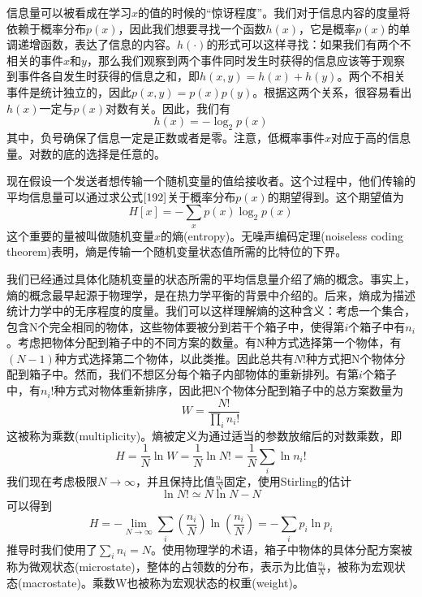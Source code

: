 信息量可以被看成在学习$x$的值的时候的“惊讶程度”。我们对于信息内容的度量将依赖于概率分布$p(x)$，因此我们想要寻找一个函数$h(x)$，它是概率$p(x)$的单调递增函数，表达了信息的内容。$h(\cdot)$的形式可以这样寻找：如果我们有两个不相关的事件$x$和$y$，那么我们观察到两个事件同时发生时获得的信息应该等于观察到事件各自发生时获得的信息之和，即$h(x,y)=h(x)+h(y)$。两个不相关事件是统计独立的，因此$p(x,y)=p(x)p(y)$。根据这两个关系，很容易看出$h(x)$一定与$p(x)$对数有关。因此，我们有
\begin{equation}
\label{192}
	h(x)=-\log_2p(x)
\end{equation}
其中，负号确保了信息一定是正数或者是零。注意，低概率事件$x$对应于高的信息量。对数的底的选择是任意的。

现在假设一个发送者想传输一个随机变量的值给接收者。这个过程中，他们传输的平均信息量可以通过求公式$\ref{192}$关于概率分布$p(x)$的期望得到。这个期望值为
\begin{equation}
	H[x]=-\sum_xp(x)\log_2p(x)
\end{equation}
这个重要的量被叫做随机变量$x$的熵(entropy)。无噪声编码定理(noiseless coding theorem)表明，熵是传输一个随机变量状态值所需的比特位的下界。

我们已经通过具体化随机变量的状态所需的平均信息量介绍了熵的概念。事实上，熵的概念最早起源于物理学，是在热力学平衡的背景中介绍的。后来，熵成为描述统计力学中的无序程度的度量。我们可以这样理解熵的这种含义：考虑一个集合，包含N个完全相同的物体，这些物体要被分到若干个箱子中，使得第$i$个箱子中有$n_i$。考虑把物体分配到箱子中的不同方案的数量。有N种方式选择第一个物体，有$(N-1)$种方式选择第二个物体，以此类推。因此总共有$N!$种方式把N个物体分配到箱子中。然而，我们不想区分每个箱子内部物体的重新排列。有第$i$个箱子中，有$n_i!$种方式对物体重新排序，因此把N个物体分配到箱子中的总方案数量为
\begin{equation}
	W=\frac{N!}{\prod_{i}n_i!}
\end{equation}
这被称为乘数(multiplicity)。熵被定义为通过适当的参数放缩后的对数乘数，即
\begin{equation}
	H=\frac{1}{N}\ln W=\frac{1}{N}\ln N! = \frac{1}{N}\sum_i \ln n_i!
\end{equation}
我们现在考虑极限$N\to \infty$，并且保持比值$\frac{n_i}{N}$固定，使用Stirling的估计
\begin{equation}
	\ln N!\simeq N\ln N - N
\end{equation}
可以得到
\begin{equation}
	H=-\lim_{N\to \infty} \sum_i \left(\frac{n_i}{N}\right)\ln\left(\frac{n_i}{N}\right)=-\sum_ip_i\ln p_i
\end{equation}
推导时我们使用了$\sum_i n_i = N$。使用物理学的术语，箱子中物体的具体分配方案被称为微观状态(microstate)，整体的占领数的分布，表示为比值$\frac{n_i}{N}$，被称为宏观状态(macrostate)。乘数W也被称为宏观状态的权重(weight)。


